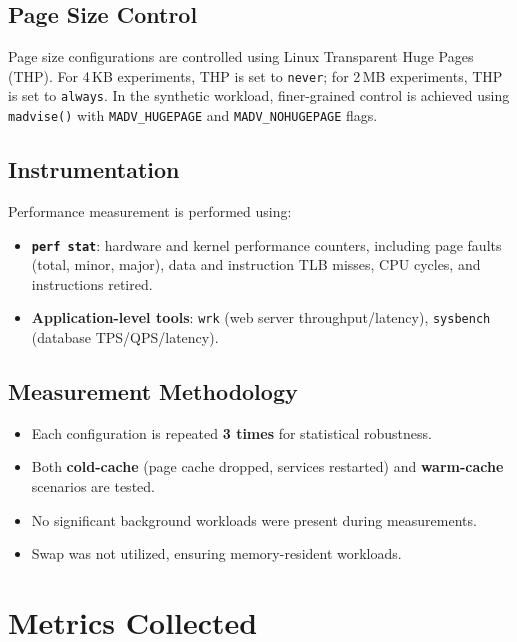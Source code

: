 \documentclass[conference]{IEEEtran}
\begin{document}
\subsection{Page Size Control}

Page size configurations are controlled using Linux Transparent Huge Pages (THP). For 4\,KB experiments, THP is set to \texttt{never}; for 2\,MB experiments, THP is set to \texttt{always}. In the synthetic workload, finer-grained control is achieved using \texttt{madvise()} with \texttt{MADV\_HUGEPAGE} and \texttt{MADV\_NOHUGEPAGE} flags.

\subsection{Instrumentation}

Performance measurement is performed using:
\begin{itemize}
    \item \textbf{\texttt{perf stat}}: hardware and kernel performance counters, including page faults (total, minor, major), data and instruction TLB misses, CPU cycles, and instructions retired.
    \item \textbf{Application-level tools}: \texttt{wrk} (web server throughput/latency), \texttt{sysbench} (database TPS/QPS/latency).
\end{itemize}

\subsection{Measurement Methodology}

\begin{itemize}
    \item Each configuration is repeated \textbf{3 times} for statistical robustness.
    \item Both \textbf{cold-cache} (page cache dropped, services restarted) and \textbf{warm-cache} scenarios are tested.
    \item No significant background workloads were present during measurements.
    \item Swap was not utilized, ensuring memory-resident workloads.
\end{itemize}

\section{Metrics Collected}
\end{document}
